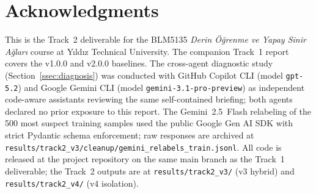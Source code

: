 \documentclass[journal]{IEEEtran}
\begin{document}
\section*{Acknowledgments}
This is the Track~2 deliverable for the BLM5135 \emph{Derin \"O\u{g}renme ve Yapay Sinir A\u{g}lar\i} course at Y\i ld\i z Technical University. The companion Track~1 report covers the v1.0.0 and v2.0.0 baselines. The cross-agent diagnostic study (Section~\ref{ssec:diagnosis}) was conducted with GitHub Copilot CLI (model \texttt{gpt-5.2}) and Google Gemini CLI (model \texttt{gemini-3.1-pro-preview}) as independent code-aware assistants reviewing the same self-contained briefing; both agents declared no prior exposure to this report. The Gemini~2.5~Flash relabeling of the 500 most suspect training samples used the public Google Gen AI SDK with strict Pydantic schema enforcement; raw responses are archived at \texttt{results/track2\_v3/cleanup/gemini\_relabels\_train.jsonl}. All code is released at the project repository on the same main branch as the Track~1 deliverable; the Track~2 outputs are at \texttt{results/track2\_v3/} (v3 hybrid) and \texttt{results/track2\_v4/} (v4 isolation).



\end{document}

